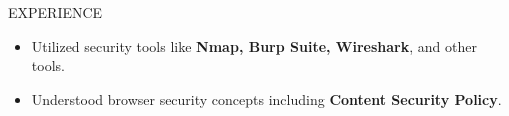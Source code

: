 \documentclass{resume} %
\begin{document}
\begin{rSection}{EXPERIENCE}
\begin{itemize}
    \item Utilized security tools like \textbf{Nmap, Burp Suite, Wireshark}, and other tools.
    \item Understood browser security concepts including \textbf{Content Security Policy}.
 \end{itemize}



\end{rSection}
\end{document}
